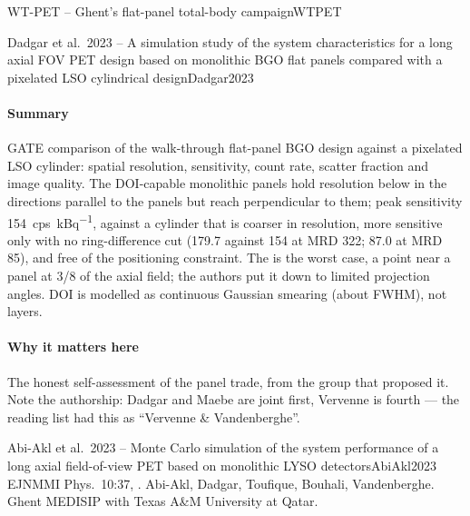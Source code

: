 \begin{programnote}{WT-PET -- Ghent's flat-panel total-body campaign}{WTPET}
\begin{papernote}{Dadgar et al.\ 2023 -- A simulation study of the system characteristics for a long axial FOV PET design based on monolithic BGO flat panels compared with a pixelated LSO cylindrical design}{Dadgar2023}
\paragraph{Summary}
GATE comparison of the walk-through flat-panel BGO design against a pixelated
LSO cylinder: spatial resolution, sensitivity, count rate, scatter fraction
and image quality. The DOI-capable monolithic panels hold resolution below
 in the directions parallel to the panels but reach 
perpendicular to them; peak sensitivity \qty{154}{cps\per\kilo\becquerel},
against a cylinder that is coarser in resolution, more sensitive only with
no ring-difference cut (179.7 against 154 at MRD 322; 87.0 at MRD 85), and free
of the positioning constraint. The  is the worst case, a point near a
panel at 3/8 of the axial field; the authors put it down to limited projection
angles. DOI is modelled as continuous Gaussian smearing (about  FWHM),
not layers.

\paragraph{Why it matters here}
The honest self-assessment of the panel trade, from the group that proposed
it. Note the authorship: Dadgar and Maebe are joint first, Vervenne is fourth --- the reading
list had this as ``Vervenne \& Vandenberghe''.

\end{papernote}

\begin{papernote}{Abi-Akl et al.\ 2023 -- Monte Carlo simulation of the system performance of a long axial field-of-view PET based on monolithic LYSO detectors}{AbiAkl2023}
EJNMMI Phys.\ 10:37, . Abi-Akl, Dadgar,
Toufique, Bouhali, Vandenberghe. Ghent MEDISIP with Texas A\&M University at
Qatar.


\end{papernote}
\end{programnote}
